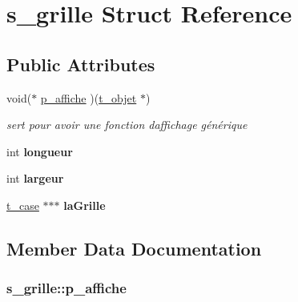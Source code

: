 \hypertarget{structs__grille}{}\section{s\+\_\+grille Struct Reference}
\label{structs__grille}
\subsection*{Public Attributes}
\begin{DoxyCompactItemize}
\item 
void($\ast$ \hyperlink{structs__grille_a6a1fee442f61163bd812944833997c24}{p\+\_\+affiche} )(\hyperlink{structt__objet}{t\+\_\+objet} $\ast$)
\begin{DoxyCompactList}\small\item\em sert pour avoir une fonction d\textquotesingle{}affichage générique \end{DoxyCompactList}\item 
int {\bfseries longueur}\hypertarget{structs__grille_a60eeaa595cc9a75ec7af7c0ac802acef}{}\label{structs__grille_a60eeaa595cc9a75ec7af7c0ac802acef}

\item 
int {\bfseries largeur}\hypertarget{structs__grille_a78f1afcc6704f3b5bd65554e16b7343e}{}\label{structs__grille_a78f1afcc6704f3b5bd65554e16b7343e}

\item 
\hyperlink{structs__case}{t\+\_\+case} $\ast$$\ast$$\ast$ {\bfseries la\+Grille}\hypertarget{structs__grille_aef2a67ac55b1d83a44fade47a6e63747}{}\label{structs__grille_aef2a67ac55b1d83a44fade47a6e63747}

\end{DoxyCompactItemize}


\subsection{Member Data Documentation}
\subsubsection[{\texorpdfstring{p\+\_\+affiche}{p_affiche}}]{\setlength{\rightskip}{0pt plus 5cm}s\+\_\+grille\+::p\+\_\+affiche}\hypertarget{structs__grille_a6a1fee442f61163bd812944833997c24}{}\label{structs__grille_a6a1fee442f61163bd812944833997c24}


